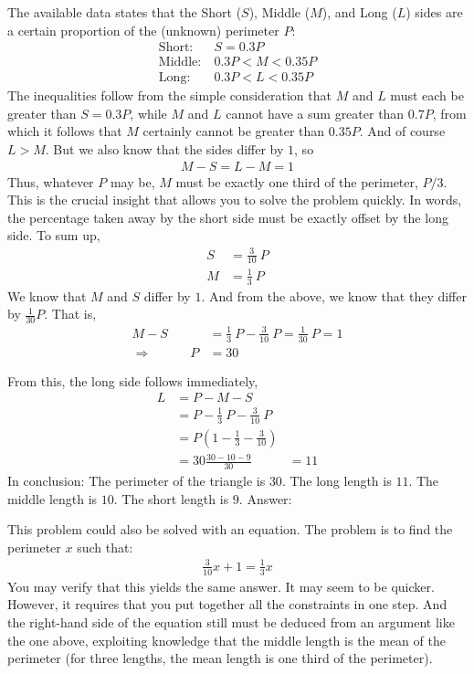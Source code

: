 \documentclass[12pt]{article}
\begin{document}
\begin{answer}
The available data states that the Short ($S$), Middle ($M$), and Long ($L$) sides are a certain proportion of the (unknown) perimeter $P$:
\begin{align*}
\text{Short}:~  & S = 0.3 P \\
\text{Middle}:~ & 0.3 P < M < 0.35 P\\
\text{Long}:~   & 0.3 P < L < 0.35 P
\end{align*}
The inequalities follow from the simple consideration that $M$ and $L$ must each be greater than $S=0.3P$, while $M$ and $L$ cannot have a sum greater than $0.7P$, from which it follows that $M$ certainly cannot be greater than $0.35P$. And of course $L>M$. But we also know that the sides differ by $1$, so 
\begin{align*}
M-S = L-M = 1
\end{align*}
Thus, whatever $P$ may be, $M$ must be exactly one third of the perimeter, $P/3$. This is the crucial insight that allows you to solve the problem quickly. In words, the percentage taken away by the short side must be exactly offset by the long side. To sum up,
\begin{align*}
S & = \tfrac{3}{10}~P \\
M & = \tfrac{1}{3}~P 
\end{align*}
We know that $M$ and $S$ differ by $1$. And from the above, we know that they differ by $\tfrac{1}{30}P$. That is,
\begin{align*}
M - S 
& = \tfrac{1}{3}~P - \tfrac{3}{10}~P 
= \tfrac{1}{30}~P = 1 \\
\Rightarrow \hspace{3em} P 
& = 30
\end{align*}

From this, the long side follows immediately,
\begin{align*}
L & = P - M - S \\
& = P - \frac{1}{3}~P - \frac{3}{10}~P \\
& = P \left(1 - \frac{1}{3} - \frac{3}{10}\right) \\
& = 30 \frac{30-10-9}{30}
& = 11
\end{align*}
In conclusion: The perimeter of the triangle is $30$. The long length is $11$. The middle length is $10$. The short length is $9$. Answer: 

This problem could also be solved with an equation. The problem is to find the perimeter $x$ such that:
\begin{align*}
\frac{3}{10} x + 1 = \frac{1}{3} x
\end{align*}
You may verify that this yields the same answer. It may seem to be quicker. However, it requires that you put together all the constraints in one step. And the right-hand side of the equation still must be deduced from an argument like the one above, exploiting knowledge that the middle length is the mean of the perimeter (for three lengths, the mean length is one third of the perimeter). 
\end{answer}
\end{document}

